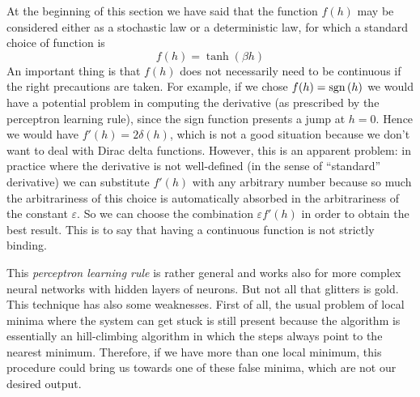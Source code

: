 At the beginning of this section we have said that the function $f(h)$ may be considered either as a stochastic law or a deterministic law, for which a standard choice of function is
\begin{equation}
f(h)=\tanh{(\beta h)}
\end{equation}
An important thing is that $f(h)$ does not necessarily need to be continuous if the right precautions are taken. For example, if we chose $f(h)=\operatorname{sgn}{(h)}$ we would have a potential problem in computing the derivative (as prescribed by the perceptron learning rule), since the sign function presents a jump at $h=0$. Hence we would have $f'(h)=2\delta(h)$, which is not a good situation because we don't want to deal with Dirac delta functions. However, this is an apparent problem: in practice where the derivative is not well-defined (in the sense of ``standard'' derivative) we can substitute $f'(h)$ with any arbitrary number because so much the arbitrariness of this choice is automatically absorbed in the arbitrariness of the constant $\varepsilon$. So we can choose the combination $\varepsilon f'(h)$ in order to obtain the best result. This is to say that having a continuous function is not strictly binding.

This \emph{perceptron learning rule} is rather general and works also for more complex neural networks with hidden layers of neurons. But not all that glitters is gold. This technique has also some weaknesses. First of all, the usual problem of local minima where the system can get stuck is still present because the algorithm is essentially an hill-climbing algorithm in which the steps always point to the nearest minimum. Therefore, if we have more than one local minimum, this procedure could bring us towards one of these false minima, which are not our desired output.

